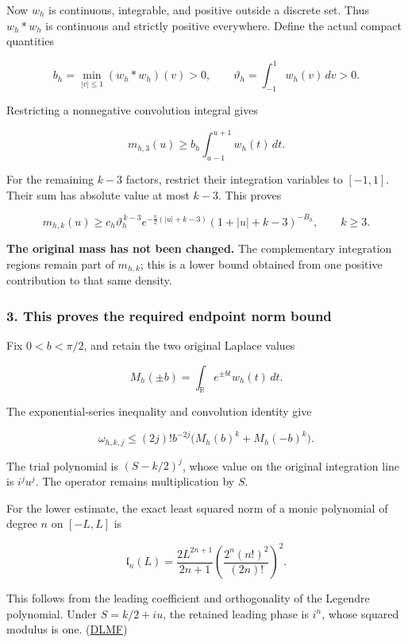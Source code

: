 Now \(w_h\) is continuous, integrable, and positive outside a discrete set. Thus \(w_h*w_h\) is continuous and strictly positive everywhere. Define the actual compact quantities

\[
b_h=\min_{|v|\le1}(w_h*w_h)(v)>0,
\qquad
\vartheta_h=\int_{-1}^{1}w_h(v)\,dv>0.
\]

Restricting a nonnegative convolution integral gives

\[
m_{h,3}(u)
\ge
b_h\int_{u-1}^{u+1}w_h(t)\,dt.
\]

For the remaining \(k-3\) factors, restrict their integration variables to \([-1,1]\). Their sum has absolute value at most \(k-3\). This proves

\[
\boxed{
m_{h,k}(u)
\ge
c_h\vartheta_h^{\,k-3}
e^{-\frac\pi2(|u|+k-3)}
(1+|u|+k-3)^{-B_h},
\qquad k\ge3.
}
\]

\textbf{The original mass has not been changed.} The complementary integration regions remain part of \(m_{h,k}\); this is a lower bound obtained from one positive contribution to that same density.

\subsubsection{3. This proves the required endpoint norm bound}\label{endpoint-user_norm_original--this-proves-the-required-endpoint-norm-bound}

Fix \(0<b<\pi/2\), and retain the two original Laplace values

\[
M_h(\pm b)=\int_{\mathbb R}e^{\pm bt}w_h(t)\,dt.
\]

The exponential-series inequality and convolution identity give

\[
\boxed{
\omega_{h,k,j}
\le
(2j)!b^{-2j}
\bigl(M_h(b)^k+M_h(-b)^k\bigr).
}
\]

The trial polynomial is \((S-k/2)^j\), whose value on the original integration line is \(i^ju^j\). The operator remains multiplication by \(S\).

For the lower estimate, the exact least squared norm of a monic polynomial of degree \(n\) on \([-L,L]\) is

\[
\boxed{
\mathfrak l_n(L)
=
\frac{2L^{2n+1}}{2n+1}
\left(\frac{2^n(n!)^2}{(2n)!}\right)^2.
}
\]

This follows from the leading coefficient and orthogonality of the Legendre polynomial. Under \(S=k/2+iu\), the retained leading phase is \(i^n\), whose squared modulus is one. (\href{https://dlmf.nist.gov/18.3}{DLMF})

